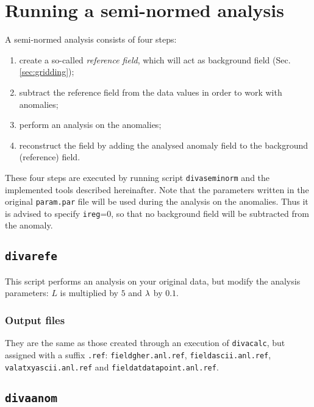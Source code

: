 \section{Running a semi-normed analysis}

A semi-normed analysis consists of four steps:
\begin{enumerate}
\item create a so-called \textit{reference field}, which will act as background field (Sec. \ref{sec:gridding});
\item subtract the reference field from the data values in order to work with anomalies;
\item perform an analysis on the anomalies;
\item reconstruct the field by adding the analysed anomaly field to the background (reference) field.
\end{enumerate}

These four steps are executed by running script \texttt{divaseminorm} and the implemented tools described hereinafter. Note that the parameters written in the original \texttt{param.par} file will be used during the analysis on the anomalies. Thus it is advised to specify \texttt{ireg}=0, so that no background field will be subtracted from the anomaly. 

\subsection{\texttt{divarefe}}

This script performs an analysis on your original data, but modify the analysis parameters: $L$ is multiplied by $5$ and $\lambda$ by $0.1$. 

\subsubsection{Output files}

They are the same as those created through an execution of \texttt{divacalc}, but assigned with a suffix \texttt{.ref}:
\texttt{fieldgher.anl.ref}, \texttt{fieldascii.anl.ref}, \texttt{valatxyascii.anl.ref} and \texttt{fieldatdatapoint.anl.ref}.


\subsection{\texttt{divaanom}}

